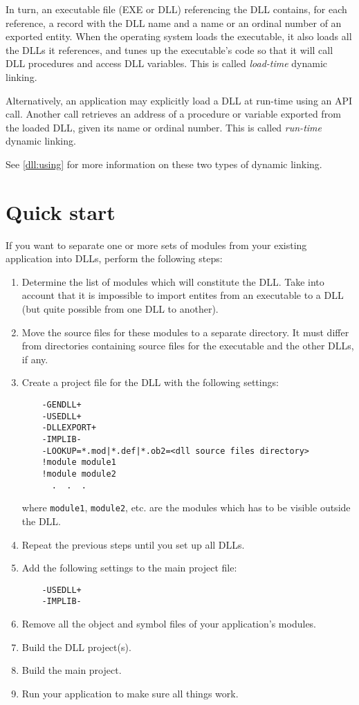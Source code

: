 In turn, an executable file (EXE or DLL) referencing the DLL contains,
for each reference, a record with the DLL name and a name or an ordinal number of
an exported entity. When the operating system loads the executable, it
also loads all the DLLs it references, and tunes up the executable's code so that
it will call DLL procedures and access DLL variables. This is called
{\em load-time} dynamic linking.

Alternatively, an application may explicitly load a DLL at run-time using
an API call. Another call retrieves an address of a procedure or variable
exported from the loaded DLL, given its name or ordinal number. This is called
{\em run-time} dynamic linking.

See \ref{dll:using} for more information on these two types of dynamic linking.

\section{Quick start}

If you want to separate one or more sets of modules from
your existing application into DLLs, perform the following steps:

\begin{enumerate}
\item Determine the list of modules which will constitute the DLL.
      Take into account that it is impossible to import entites from an executable
      to a DLL (but quite possible from one DLL to another). %
\item Move the source files for these modules to a separate directory.
      It must differ from directories containing source files for
      the executable and the other DLLs, if any.
\item Create a project file for the DLL with the following settings:
{\samepage
\begin{verbatim}
    -GENDLL+
    -USEDLL+
    -DLLEXPORT+
    -IMPLIB-
    -LOOKUP=*.mod|*.def|*.ob2=<dll source files directory>
    !module module1
    !module module2
      .  .  .
\end{verbatim}
where \verb'module1', \verb'module2', etc. are the modules which has to be visible
outside the DLL.
} %
\item Repeat the previous steps until you set up all DLLs.
\item Add the following settings to the main project file:
\begin{verbatim}
    -USEDLL+
    -IMPLIB-
\end{verbatim}
\item Remove all the object and symbol files of your application's modules.
\item Build the DLL project(s).
\item Build the main project.
\item Run your application to make sure all things work.
\end{enumerate}


